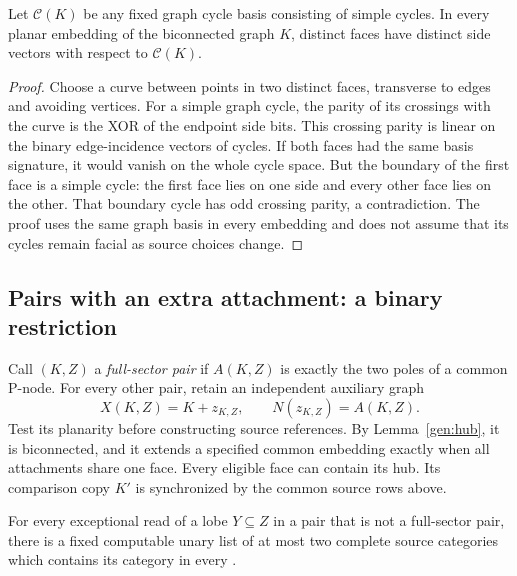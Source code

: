 \begin{lemma}
\label{gen:basis}
Let $\mathcal C(K)$ be any fixed graph cycle basis consisting of simple
cycles.  In every planar embedding of the biconnected graph $K$, distinct
faces have distinct side vectors with respect to $\mathcal C(K)$.
\end{lemma}

\begin{proof}
Choose a curve between points in two distinct faces, transverse to edges
and avoiding vertices.  For a simple graph cycle, the parity of its
crossings with the curve is the XOR of the endpoint side bits.  This
crossing parity is linear on the binary edge-incidence vectors of cycles.
If both faces had the same basis signature, it would vanish on the whole
cycle space.  But the boundary of the first face is a simple cycle: the
first face lies on one side and every other face lies on the other.
That boundary cycle has odd crossing parity, a contradiction.  The proof
uses the same graph basis in every embedding and does not assume that
its cycles remain facial as source choices change.
\end{proof}

\subsection{Pairs with an extra attachment: a binary restriction}

Call $(K,Z)$ a \emph{full-sector pair} if $A(K,Z)$ is exactly the two
poles of a common P-node.  For every other pair, retain an independent
auxiliary graph
\[
 X(K,Z)=K+z_{K,Z},\qquad N(z_{K,Z})=A(K,Z).
\]
Test its planarity before constructing source references.  By
Lemma~\ref{gen:hub}, it is biconnected, and it extends a specified common
embedding exactly when all attachments share one face.  Every eligible
face can contain its hub.  Its comparison copy $K'$ is synchronized by
the common source rows above.

\begin{lemma}
\label{gen:two-categories}
For every exceptional read of a lobe $Y\subseteq Z$ in a pair that is
not a full-sector pair, there is a fixed computable unary list of at
most two complete source categories which contains its category in
every \SEFE.
\end{lemma}

